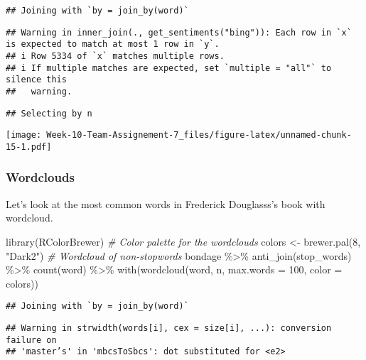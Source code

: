 \documentclass[
]{article}
\newenvironment{Shaded}{\begin{snugshade}}{\end{snugshade}}
\newcommand{\AttributeTok}[1]{\textcolor[rgb]{0.77,0.63,0.00}{#1}}
\newcommand{\CommentTok}[1]{\textcolor[rgb]{0.56,0.35,0.01}{\textit{#1}}}
\newcommand{\DecValTok}[1]{\textcolor[rgb]{0.00,0.00,0.81}{#1}}
\newcommand{\FunctionTok}[1]{\textcolor[rgb]{0.00,0.00,0.00}{#1}}
\newcommand{\NormalTok}[1]{#1}
\newcommand{\OtherTok}[1]{\textcolor[rgb]{0.56,0.35,0.01}{#1}}
\newcommand{\SpecialCharTok}[1]{\textcolor[rgb]{0.00,0.00,0.00}{#1}}
\newcommand{\StringTok}[1]{\textcolor[rgb]{0.31,0.60,0.02}{#1}}
\begin{document}
\begin{verbatim}
## Joining with `by = join_by(word)`
\end{verbatim}

\begin{verbatim}
## Warning in inner_join(., get_sentiments("bing")): Each row in `x` is expected to match at most 1 row in `y`.
## i Row 5334 of `x` matches multiple rows.
## i If multiple matches are expected, set `multiple = "all"` to silence this
##   warning.
\end{verbatim}

\begin{verbatim}
## Selecting by n
\end{verbatim}

\texttt{[image: Week-10-Team-Assignement-7\_files/figure-latex/unnamed-chunk-15-1.pdf]}

\hypertarget{wordclouds}{%
\subsubsection{Wordclouds}\label{wordclouds}}

Let's look at the most common words in Frederick Douglasss's book with
wordcloud.

\begin{Shaded}
\begin{Highlighting}[]
\FunctionTok{library}\NormalTok{(RColorBrewer)}
\CommentTok{\# Color palette for the wordclouds}
\NormalTok{colors }\OtherTok{\textless{}{-}} \FunctionTok{brewer.pal}\NormalTok{(}\DecValTok{8}\NormalTok{, }\StringTok{"Dark2"}\NormalTok{)}
\CommentTok{\# Wordcloud of non{-}stopwords}
\NormalTok{bondage }\SpecialCharTok{\%\textgreater{}\%}
  \FunctionTok{anti\_join}\NormalTok{(stop\_words) }\SpecialCharTok{\%\textgreater{}\%}
  \FunctionTok{count}\NormalTok{(word) }\SpecialCharTok{\%\textgreater{}\%}
  \FunctionTok{with}\NormalTok{(}\FunctionTok{wordcloud}\NormalTok{(word, n, }\AttributeTok{max.words =} \DecValTok{100}\NormalTok{, }\AttributeTok{color =}\NormalTok{ colors))}
\end{Highlighting}
\end{Shaded}

\begin{verbatim}
## Joining with `by = join_by(word)`
\end{verbatim}

\begin{verbatim}
## Warning in strwidth(words[i], cex = size[i], ...): conversion failure on
## 'master’s' in 'mbcsToSbcs': dot substituted for <e2>
\end{verbatim}
\end{document}
